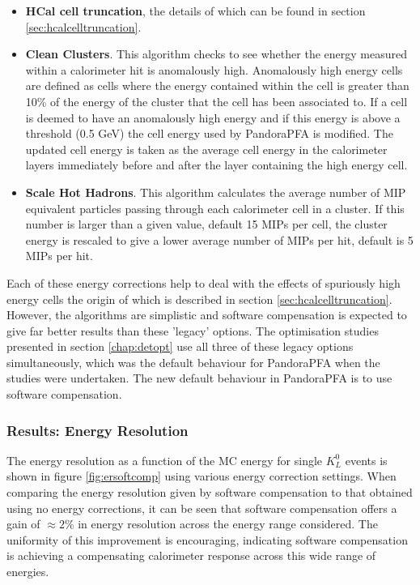 \begin{itemize}
\item \textbf{HCal cell truncation}, the details of which can be found in section \ref{sec:hcalcelltruncation}.
\item \textbf{Clean Clusters}.  This algorithm checks to see whether the energy measured within a calorimeter hit is anomalously high.  Anomalously high energy cells are defined as cells where the energy contained within the cell is greater than 10\% of the energy of the cluster that the cell has been associated to.  If a cell is deemed to have an anomalously high energy and if this energy is above a threshold (0.5 GeV) the cell energy used by PandoraPFA is modified.  The updated cell energy is taken as the average cell energy in the calorimeter layers immediately before and after the layer containing the high energy cell.    
\item \textbf{Scale Hot Hadrons}.  This algorithm calculates the average number of MIP equivalent particles passing through each calorimeter cell in a cluster.  If this number is larger than a given value, default 15 MIPs per cell, the cluster energy is rescaled to give a lower average number of MIPs per hit, default is 5 MIPs per hit.  
\end{itemize}

Each of these energy corrections help to deal with the effects of spuriously high energy cells the origin of which is described in section \ref{sec:hcalcelltruncation}.  However, the algorithms are simplistic and software compensation is expected to give far better results than these 'legacy' options.  The optimisation studies presented in section \ref{chap:detopt} use all three of these legacy options simultaneously, which was the default behaviour for PandoraPFA when the studies were undertaken.  The new default behaviour in PandoraPFA is to use software compensation.


\subsubsection{Results: Energy Resolution}
\label{sec:softcomper}
The energy resolution as a function of the MC energy for single $K^{0}_{L}$ events is shown in figure \ref{fig:ersoftcomp} using various energy correction settings.  When comparing the energy resolution given by software compensation to that obtained using no energy corrections, it can be seen that software compensation offers a gain of $\approx 2 \%$ in energy resolution across the energy range considered.  The uniformity of this improvement is encouraging, indicating software compensation is achieving a compensating calorimeter response across this wide range of energies.  

